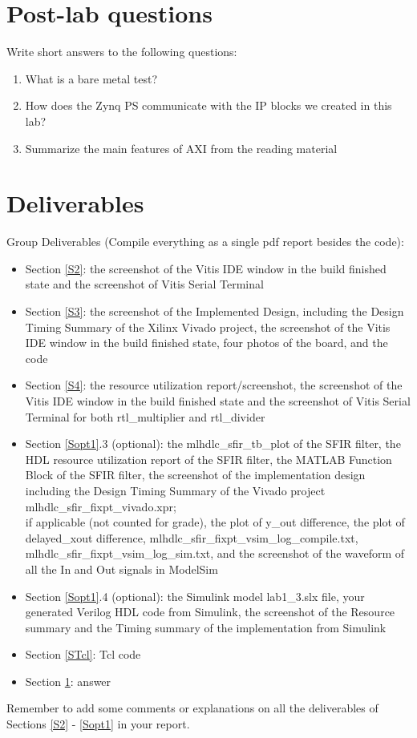 \documentclass[a4paper,12pt,twoside]{article}
\begin{document}
\section{Post-lab questions}\label{SQ}
Write short answers to the following questions:
\begin{enumerate}
    \item What is a bare metal test?
    \item How does the Zynq PS communicate with the IP blocks we created in this lab?
    \item Summarize the main features of AXI from the reading material
\end{enumerate}
\newpage
\section{Deliverables}
Group Deliverables (Compile everything as a single pdf report besides the code):
\begin{itemize}
    \item Section \ref{S2}: the screenshot of the Vitis IDE window in the build finished state and the screenshot of Vitis Serial Terminal
    \item Section \ref{S3}: the screenshot of the Implemented Design, including the Design Timing Summary of the Xilinx Vivado project, the screenshot of the Vitis IDE window in the build finished state, four photos of the board, and the code
    \item Section \ref{S4}: the resource utilization report/screenshot, the screenshot of the Vitis IDE window in the build finished state and the screenshot of Vitis Serial Terminal for both rtl\_multiplier and rtl\_divider
    \item Section \ref{Sopt1}.3 (optional): the mlhdlc\_sfir\_tb\_plot of the SFIR filter, the HDL resource utilization report of the SFIR filter, the MATLAB Function Block of the SFIR filter, the screenshot of the implementation design including the Design Timing Summary of the Vivado project mlhdlc\_sfir\_fixpt\_vivado.xpr;\\
    if applicable (not counted for grade), the plot of y\_out difference, the plot of delayed\_xout difference, mlhdlc\_sfir\_fixpt\_vsim\_log\_compile.txt,\\
    mlhdlc\_sfir\_fixpt\_vsim\_log\_sim.txt, and the screenshot of the waveform of all the In and Out signals in ModelSim
    \item Section \ref{Sopt1}.4 (optional): the Simulink model lab1\_3.slx file, your generated Verilog HDL code from Simulink, the screenshot of the Resource summary and the Timing summary of the implementation from Simulink
    \item Section \ref{STcl}: Tcl code
    \item Section \ref{SQ}: answer
\end{itemize}
Remember to add some comments or explanations on all the deliverables of Sections \ref{S2} - \ref{Sopt1} in your report.
\end{document}

